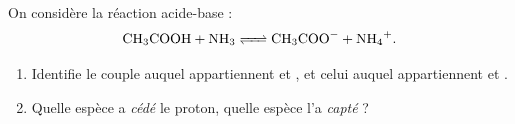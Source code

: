 \documentclass[11pt,a4paper]{article}
\begin{document}
\begin{exo}
On considère la réaction acide-base :
\[ \ce{CH3COOH + NH3 <=> CH3COO- + NH4+}. \]
\begin{enumerate}[label=\alph*)]
  \item Identifie le couple auquel appartiennent  et , et celui auquel appartiennent
         et .
  \item Quelle espèce a \emph{cédé} le proton, quelle espèce l'a \emph{capté} ?
\end{enumerate}
\end{exo}
\end{document}
